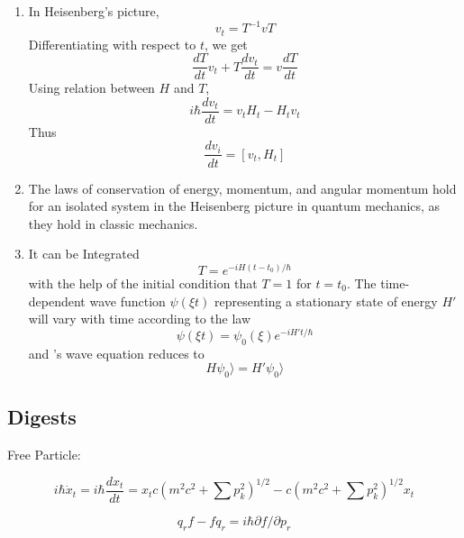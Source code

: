 \begin{enumerate}
	\item In Heisenberg's picture,
	\begin{equation}
	v_t=T^{-1} v T
	\end{equation}
	Differentiating with respect to $t$, we get
	\begin{equation}
	\frac{dT}{dt} v_t + T \frac{dv_t}{dt} = v\frac{dT}{dt}
	\end{equation}
	Using relation between $H$ and $T$,
	\begin{equation}
	i\hbar \frac{dv_t}{dt}= v_t H_t - H_t v_t
	\end{equation}
	Thus
	\begin{equation}
	\frac{dv_i}{dt}=[v_t,H_t]
	\end{equation}

	\item The laws of conservation of energy, momentum, and angular momentum hold for an isolated system in the Heisenberg picture in quantum mechanics, as they hold in classic mechanics.

	\item It can be Integrated
	\begin{equation}
	T= e^{-iH(t-t_0)/\hbar}
	\end{equation}
	with the help of the initial condition that $T=1$ for $t=t_0$. 
	The time-dependent wave function $\psi(\xi t)$ representing a stationary state of energy $H'$ will vary with time according to the law 
	\begin{equation}
	\psi(\xi t) = \psi_0(\xi) e^{-iH't/\hbar}
	\end{equation}
	and \sch's wave equation reduces to
	\begin{equation}
	H \psi_0 \rangle = H' \psi_0 \rangle
	\end{equation}


\end{enumerate}


\subsection{Digests}

{\Large Free Particle:}

\begin{equation}
i\hbar \dot{x}_t = i\hbar \frac{dx_t}{dt} = x_t c(m^2c^2+\sum p_k^2)^{1/2} - c (m^2c^2+\sum p_k^2)^{1/2} x_t
\end{equation}

\begin{equation}
q_r f - fq_r = i\hbar \partial f / \partial p_r
\end{equation}

